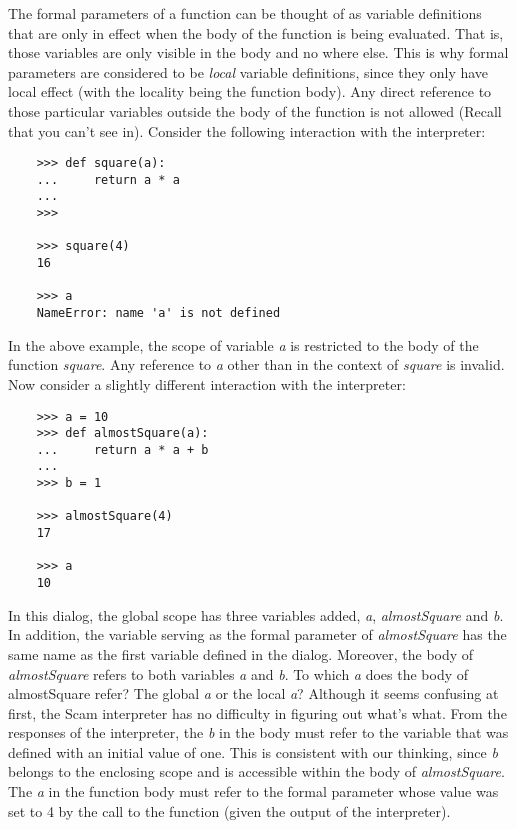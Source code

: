 The formal parameters of a function can be thought of
as variable definitions that are only in effect when
the body of the function is being evaluated. That is,
those variables are only visible in the body and no where
else. This is why formal parameters are considered to be
{\it local} variable definitions, since they only have local
effect (with the locality being
the function body). Any direct reference to those
particular variables outside the body of the function
is not allowed (Recall that you can't see in).
Consider the following interaction with
the interpreter:

\begin{verbatim}
    >>> def square(a):
    ...     return a * a
    ...
    >>>
     
    >>> square(4)
    16
     
    >>> a
    NameError: name 'a' is not defined
\end{verbatim}


In the above example, the scope of variable {\it a} is restricted
to the body of the function {\it square}.
Any reference to
{\it a} other than in the context of {\it square} is invalid. Now
consider a slightly different interaction with the
interpreter:

\begin{verbatim}
    >>> a = 10
    >>> def almostSquare(a):
    ...     return a * a + b
    ...
    >>> b = 1
     
    >>> almostSquare(4)
    17

    >>> a
    10
\end{verbatim}

In this dialog, the global scope has three
variables added, {\it a}, {\it almostSquare} and
{\it b}.
In addition, the variable serving as the formal parameter
of {\it almostSquare} has the same name as the first variable
defined in the dialog. Moreover, the body of {\it almostSquare}
refers to both variables {\it a} and {\it b}. To which {\it a} does
the body of almostSquare refer? The global {\it a} or the local {\it a}?
Although it seems confusing at first,
the Scam interpreter has no difficulty in figuring out
what's what. From the responses of the interpreter,
the {\it b} in the body must refer to the variable that was
defined with an initial value of one. This is consistent with
our thinking, since {\it b} belongs to the enclosing scope
and is accessible within the body of {\it almostSquare}.
The {\it a} in the function body must refer to the
formal parameter whose value was set to 4 by the call to
the function (given the output of the interpreter).

